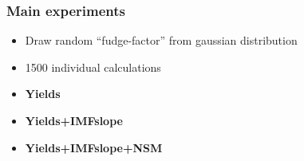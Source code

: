 \begin{frame}
  \frametitle{Main experiments}
  \begin{itemize}
  \item Draw random ``fudge-factor'' from gaussian distribution
  \item 1500 individual calculations
  \item \textbf{Yields}
  \item \textbf{Yields+IMFslope}
  \item \textbf{Yields+IMFslope+NSM}
  \end{itemize}
\end{frame}


